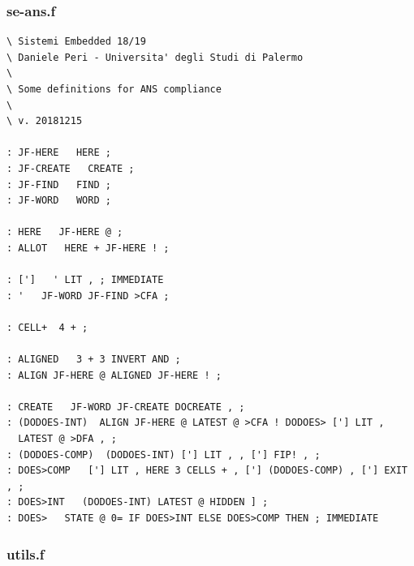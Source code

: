 \documentclass[]{article}
\begin{document}
\subsubsection{se-ans.f}
\begin{verbatim}
\ Sistemi Embedded 18/19
\ Daniele Peri - Universita' degli Studi di Palermo
\
\ Some definitions for ANS compliance
\
\ v. 20181215

: JF-HERE   HERE ;
: JF-CREATE   CREATE ;
: JF-FIND   FIND ;
: JF-WORD   WORD ;

: HERE   JF-HERE @ ;
: ALLOT   HERE + JF-HERE ! ;

: [']   ' LIT , ; IMMEDIATE
: '   JF-WORD JF-FIND >CFA ; 

: CELL+  4 + ;

: ALIGNED   3 + 3 INVERT AND ;
: ALIGN JF-HERE @ ALIGNED JF-HERE ! ;

: CREATE   JF-WORD JF-CREATE DOCREATE , ;
: (DODOES-INT)  ALIGN JF-HERE @ LATEST @ >CFA ! DODOES> ['] LIT ,  
  LATEST @ >DFA , ; 
: (DODOES-COMP)  (DODOES-INT) ['] LIT , , ['] FIP! , ; 
: DOES>COMP   ['] LIT , HERE 3 CELLS + , ['] (DODOES-COMP) , ['] EXIT , ;
: DOES>INT   (DODOES-INT) LATEST @ HIDDEN ] ;
: DOES>   STATE @ 0= IF DOES>INT ELSE DOES>COMP THEN ; IMMEDIATE
\end{verbatim}

\subsubsection{utils.f}
\end{document}
